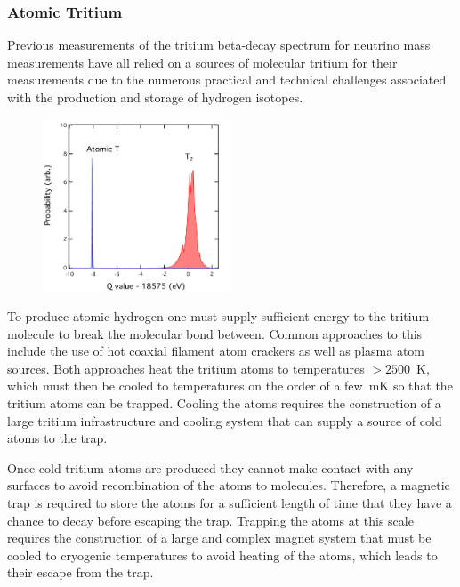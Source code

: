 \subsubsection*{Atomic Tritium}

Previous measurements of the tritium beta-decay spectrum for neutrino mass measurements have all relied on a sources of molecular tritium for their measurements due to the numerous practical and technical challenges associated with the production and storage of hydrogen isotopes.

\begin{figure}[htbp]
    \centering
    \includegraphics*[width=0.5\textwidth]{figs/Chapter-3/atmol2.pdf}
    \caption{\label{fig:chap3-atomic-vs-mol-final-state-spectra}}
\end{figure}

To produce atomic hydrogen one must supply sufficient energy to the tritium molecule to break the molecular bond between. Common approaches to this include the use of hot coaxial filament atom crackers as well as plasma atom sources. Both approaches heat the tritium atoms to temperatures $>2500$~K, which must then be cooled to temperatures on the order of a few~mK so that the tritium atoms can be trapped. Cooling the atoms requires the construction of a large tritium infrastructure and cooling system that can supply a source of cold atoms to the trap. 

Once cold tritium atoms are produced they cannot make contact with any surfaces to avoid recombination of the atoms to molecules. Therefore, a magnetic trap is required to store the atoms for a sufficient length of time that they have a chance to decay before escaping the trap. Trapping the atoms at this scale requires the construction of a large and complex magnet system that must be cooled to cryogenic temperatures to avoid heating of the atoms, which leads to their escape from the trap.


